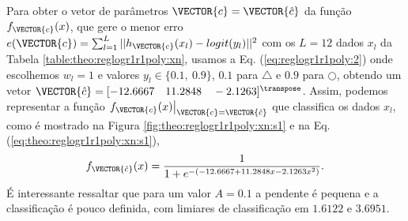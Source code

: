 \begin{SolutionT}\label{sol:theo:reglogr1r1poly:s1}
Para obter o vetor de parâmetros $\VECTOR{c}=\VECTOR{\hat{c}}$ da função $f_{\VECTOR{c}}(x)$, 
que gere o menor erro $e(\VECTOR{c}) =   \sum_{l=1}^{L} ||h_{\VECTOR{c}}(x_l)-logit(y_l)||^2$
com os $L=12$ dados $x_l$ da Tabela \ref{table:theo:reglogr1r1poly:xn},
usamos a Eq. (\ref{eq:reglogr1r1poly:2}) onde escolhemos $w_l=1$ e valores $y_l \in \{0.1,~ 0.9\}$,
$0.1$ para $\bigtriangleup$ e $0.9$ para $\bigcirc$,
obtendo um vetor $\VECTOR{\hat{c}}=[-12.6667\quad 11.2848\quad -2.1263]^{\transpose}$.
Assim, podemos representar a função $\left.f_{\VECTOR{c}}(x)\right|_{\VECTOR{c}=\VECTOR{\hat{c}}}$ que classifica os dados $x_l$, 
como é mostrado na Figura \ref{fig:theo:reglogr1r1poly:xn:s1} e na Eq. (\ref{eq:theo:reglogr1r1poly:xn:s1}),
\begin{equation}\label{eq:theo:reglogr1r1poly:xn:s1}
f_{\VECTOR{\hat{c}}}(x)= \frac{1}{1+e^{-(-12.6667  +11.2848 x  -2.1263 x^2)}}.
\end{equation}
É interessante ressaltar que para um valor $A=0.1$ a pendente é pequena e a classificação é pouco definida,
com limiares de classificação em $1.6122$ e $3.6951$.
\end{SolutionT}


